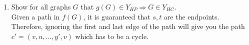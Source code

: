\documentclass[11pt,a4paper]{article}
\newcommand{\hc} {HC}
\newcommand{\hp} {HP}
\begin{document}
\begin{enumerate}
\begin{enumerate}
\\
        
               
        \item Show for all graphs $G$ that $g(G) \in Y_{\hp{}} \Rightarrow G \in Y_{\hc{}}$.\\
        Given a path in $f(G)$, it is guaranteed that $s, t$ are the endpoints. Therefore, ignoring the first and last edge of the path will give you the path $c' = (v,u,\ldots , y', v)$ which has to be a cycle.
    \end{enumerate}
\end{enumerate}
\end{document}
